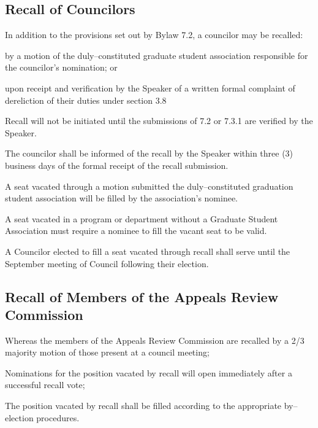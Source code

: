 \subsection {Recall of Councilors}
\begin{longenum}[ label*=\thesubsection.\arabic*., align=left]
	\item In addition to the provisions set out by Bylaw 7.2, a councilor may be recalled:
    \begin{longenum}[ label*=\arabic*., align=left]
		\item by a motion of the duly--constituted graduate student association responsible for the councilor's nomination; or
        \item upon receipt and verification by the Speaker of a written formal complaint of dereliction of their duties under section 3.8
	\end{longenum}
    \item Recall will not be initiated until the submissions of 7.2 or 7.3.1 are verified by the Speaker.
    \item The councilor shall be informed of the recall by the Speaker within three (3) business days of the formal receipt of the recall submission.
    \item A seat vacated through a motion submitted the duly--constituted graduation student association will be filled by the association's nominee.
    \item A seat vacated in a program or department without a Graduate Student Association must require a nominee to fill the vacant seat to be valid. 
    \item A Councilor elected to fill a seat vacated through recall shall serve until the September meeting of Council following their election.
\end{longenum}

\subsection{Recall of Members of the Appeals Review Commission}
\begin{longenum}[ label*=\thesubsection.\arabic*., align=left]
	\item Whereas the members of the Appeals Review Commission are recalled by a 2/3 majority motion of those present at a council meeting;
    \item Nominations for the position vacated by recall will open immediately after a successful recall vote;
    \item The position vacated by recall shall be filled according to the appropriate by--election procedures.
\end{longenum}

